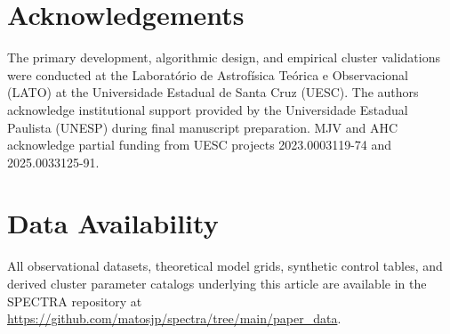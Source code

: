 \documentclass[fleqn,usenatbib]{mnras}
\begin{document}
\section*{Acknowledgements}

The primary development, algorithmic design, and empirical cluster validations were conducted at the Laboratório de Astrofísica Teórica e Observacional (LATO) at the Universidade Estadual de Santa Cruz (UESC). The authors acknowledge institutional support provided by the Universidade Estadual Paulista (UNESP) during final manuscript preparation. MJV and AHC acknowledge partial funding from UESC projects 2023.0003119-74 and 2025.0033125-91.


\section*{Data Availability}

All observational datasets, theoretical model grids, synthetic control tables, and derived cluster parameter catalogs underlying this article are available in the \textsc{SPECTRA} repository at \url{https://github.com/matosjp/spectra/tree/main/paper_data}.








\bsp
\label{lastpage}
\end{document}
